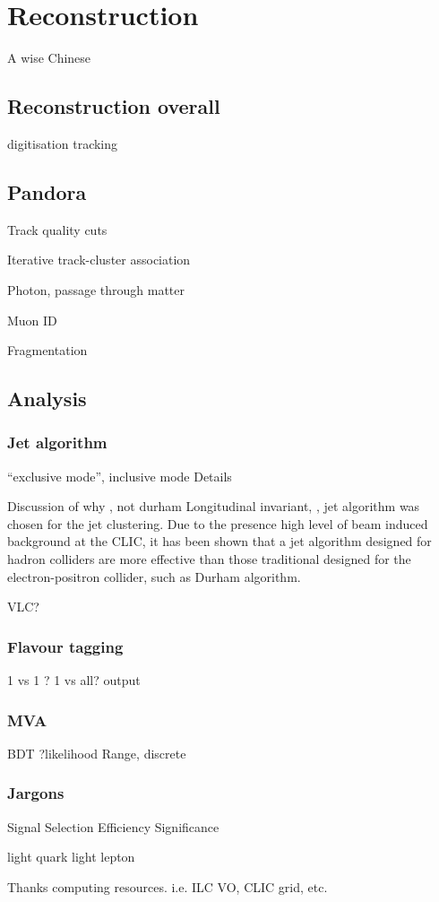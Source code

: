 \chapter{Reconstruction}
\label{chap:Reconstruction}

%
{A wise Chinese}%


\section{Reconstruction overall}
digitisation
tracking

\section{Pandora}

Track quality cuts

Iterative track-cluster association

Photon, passage through matter

Muon ID

Fragmentation

\section{Analysis}

\subsection{Jet algorithm}

``exclusive mode'', inclusive mode
Details

Discussion of why \kt, not durham
Longitudinal invariant, \kt, jet algorithm was chosen for the jet clustering. Due to the presence high level of beam induced background at the CLIC, it has been shown that a jet algorithm designed for hadron colliders are more effective than those traditional designed for the electron-positron collider, such as Durham algorithm.\cite{}

VLC?

\subsection{Flavour tagging}

1 vs 1 ? 1 vs all?
output

\subsection{MVA}

BDT
?likelihood
Range, discrete
\subsection{Jargons}
Signal
Selection
Efficiency
Significance

\qlight light quark
light lepton

Thanks computing resources. i.e. ILC VO, CLIC grid, etc. 